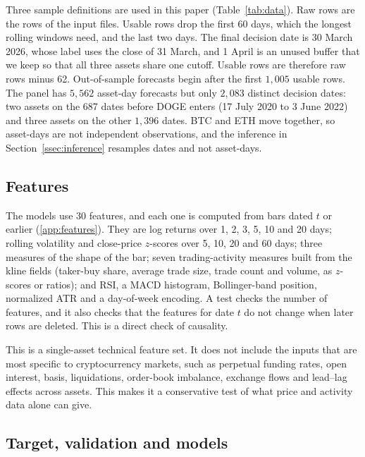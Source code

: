 \documentclass[preprint,12pt,authoryear,a4paper]{elsarticle}
\begin{document}
Three sample definitions are used in this paper (Table~\ref{tab:data}). Raw rows
are the rows of the input files. Usable rows drop the first 60 days, which the
longest rolling windows need, and the last two days. The final decision date is 30
March 2026, whose label uses the close of 31 March, and 1 April is an unused buffer
that we keep so that all three assets share one cutoff. Usable rows are therefore
raw rows minus 62. Out-of-sample forecasts begin after the first $1{,}005$ usable
rows. The panel has $5{,}562$ asset-day forecasts but only $2{,}083$ distinct
decision dates: two assets on the 687 dates before DOGE enters (17 July 2020 to 3
June 2022) and three assets on the other $1{,}396$ dates. BTC and ETH move
together, so asset-days are not independent observations, and the inference in
Section~\ref{ssec:inference} resamples dates and not asset-days.

\subsection{Features}

The models use 30 features, and each one is computed from bars dated $t$ or earlier
(\ref{app:features}). They are log returns over 1, 2, 3, 5, 10 and 20 days; rolling
volatility and close-price $z$-scores over 5, 10, 20 and 60 days; three measures of
the shape of the bar; seven trading-activity measures built from the kline fields
(taker-buy share, average trade size, trade count and volume, as $z$-scores or
ratios); and RSI, a MACD histogram, Bollinger-band position, normalized ATR and a
day-of-week encoding. A test checks the number of features, and it also checks that
the features for date $t$ do not change when later rows are deleted. This is a
direct check of causality.

This is a single-asset technical feature set. It does not include the inputs that
are most specific to cryptocurrency markets, such as perpetual funding rates, open
interest, basis, liquidations, order-book imbalance, exchange flows and lead--lag
effects across assets. This makes it a conservative test of what price and activity
data alone can give.

\subsection{Target, validation and models}
\end{document}
